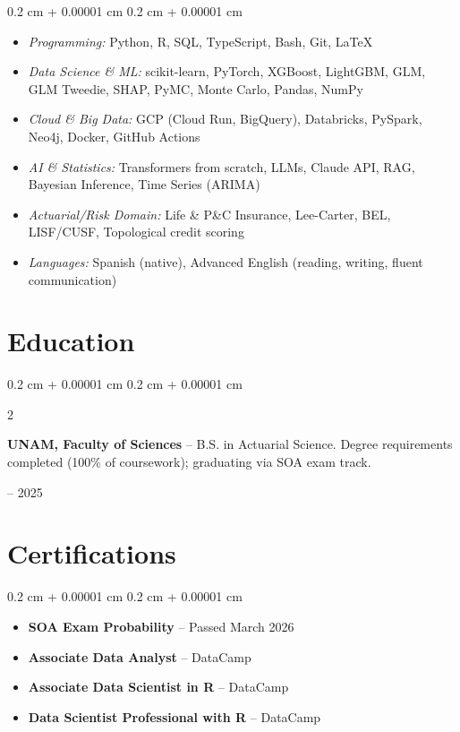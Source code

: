 \documentclass[10pt, letterpaper]{article}
\newenvironment{highlightsforbulletentries}{
    \begin{itemize}[
        topsep=0.02 cm,
        parsep=0.05 cm,
        partopsep=0pt,
        itemsep=0pt,
        leftmargin=10pt
    ]
}{
    \end{itemize}
}
\newenvironment{onecolentry}{
    \begin{adjustwidth}{
        0.2 cm + 0.00001 cm
    }{
        0.2 cm + 0.00001 cm
    }
}{
    \end{adjustwidth}
}
\newenvironment{twocolentry}[2][]{
    \onecolentry
    \def\secondColumn{#2}
    \setcolumnwidth{\fill, 4.0 cm}
    \begin{paracol}{2}
}{
    \switchcolumn \raggedleft \secondColumn
    \end{paracol}
    \endonecolentry
}
\let\hrefWithoutArrow\href
\renewcommand{\href}[2]{\hrefWithoutArrow{#1}{\ifthenelse{\equal{#2}{}}{ }{#2 }\raisebox{.15ex}{\footnotesize \faExternalLink*}}}
\begin{document}
\begin{onecolentry}
    \begin{highlightsforbulletentries}
        \item \textit{Programming:} Python, R, SQL, TypeScript, Bash, Git, \LaTeX
        \item \textit{Data Science \& ML:} scikit-learn, PyTorch, XGBoost, LightGBM, GLM, GLM Tweedie, SHAP, PyMC, Monte Carlo, Pandas, NumPy
        \item \textit{Cloud \& Big Data:} GCP (Cloud Run, BigQuery), Databricks, PySpark, Neo4j, Docker, GitHub Actions
        \item \textit{AI \& Statistics:} Transformers from scratch, LLMs, Claude API, RAG, Bayesian Inference, Time Series (ARIMA)
        \item \textit{Actuarial/Risk Domain:} Life \& P\&C Insurance, Lee-Carter, BEL, LISF/CUSF, Topological credit scoring
        \item \textit{Languages:} Spanish (native), Advanced English (reading, writing, fluent communication)
    \end{highlightsforbulletentries}
\end{onecolentry}


    \section{Education}

        \begin{twocolentry}{2021 -- 2025}
            \textbf{UNAM, Faculty of Sciences} -- B.S. in Actuarial Science. Degree requirements completed (100\% of coursework); graduating via SOA exam track.
        \end{twocolentry}

    \section{Certifications}

    \begin{onecolentry}
        \begin{highlightsforbulletentries}
            \item \textbf{SOA Exam Probability} -- Passed March 2026 \href{https://drive.google.com/file/d/1rt3emgBnPpQi7NiXkBQeA5WwJTV0JuAf/view?usp=sharing}{}
            \item \textbf{Associate Data Analyst} -- DataCamp \href{https://drive.google.com/drive/folders/1-QUuVH3zPBPsl6RhUvuUWxpZkP1i8TYb?usp=sharing}{}
            \item \textbf{Associate Data Scientist in R} -- DataCamp \href{https://drive.google.com/file/d/1xVLk15A1LBbyXH1fZnd4eBTaJ4d8FLLO/view?usp=drive_link}{}
            \item \textbf{Data Scientist Professional with R} -- DataCamp \href{https://drive.google.com/file/d/1Woe6xqxofloFZ9uM2f5VsdGxY-WQWCRI/view?usp=drive_link}{}
        \end{highlightsforbulletentries}
    \end{onecolentry}
\end{document}
